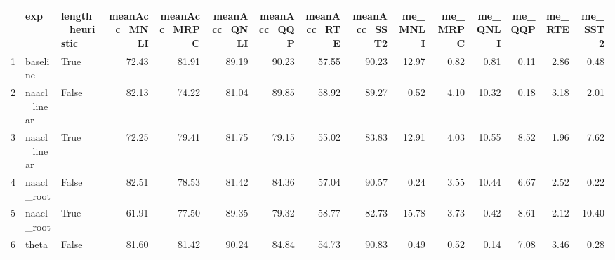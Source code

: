 \begin{table}[ht]
\centering
\begin{tabular}{rllrrrrrrrrrrrr}
  \hline
 & exp & length\_heuristic & meanAcc\_MNLI & meanAcc\_MRPC & meanAcc\_QNLI & meanAcc\_QQP & meanAcc\_RTE & meanAcc\_SST2 & me\_MNLI & me\_MRPC & me\_QNLI & me\_QQP & me\_RTE & me\_SST2 \\ 
  \hline
1 & baseline & True & 72.43 & 81.91 & 89.19 & 90.23 & 57.55 & 90.23 & 12.97 & 0.82 & 0.81 & 0.11 & 2.86 & 0.48 \\ 
  2 & naacl\_linear & False & 82.13 & 74.22 & 81.04 & 89.85 & 58.92 & 89.27 & 0.52 & 4.10 & 10.32 & 0.18 & 3.18 & 2.01 \\ 
  3 & naacl\_linear & True & 72.25 & 79.41 & 81.75 & 79.15 & 55.02 & 83.83 & 12.91 & 4.03 & 10.55 & 8.52 & 1.96 & 7.62 \\ 
  4 & naacl\_root & False & 82.51 & 78.53 & 81.42 & 84.36 & 57.04 & 90.57 & 0.24 & 3.55 & 10.44 & 6.67 & 2.52 & 0.22 \\ 
  5 & naacl\_root & True & 61.91 & 77.50 & 89.35 & 79.32 & 58.77 & 82.73 & 15.78 & 3.73 & 0.42 & 8.61 & 2.12 & 10.40 \\ 
  6 & theta & False & 81.60 & 81.42 & 90.24 & 84.84 & 54.73 & 90.83 & 0.49 & 0.52 & 0.14 & 7.08 & 3.46 & 0.28 \\ 
   \hline
\end{tabular}
\end{table}
